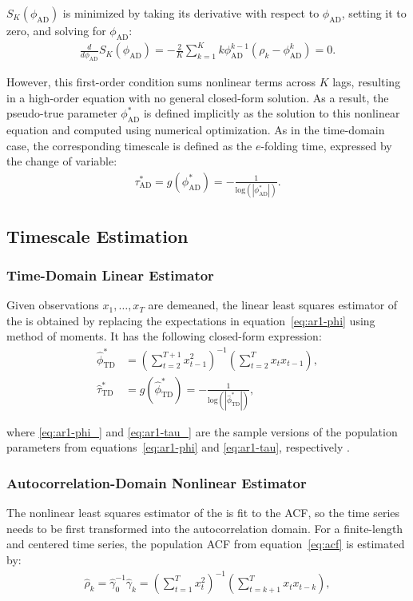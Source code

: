 \documentclass[9pt]{article}
\newcommand{\hatphitd}{\hat{\phi}^*_{\scriptscriptstyle\text{TD}}}
\newcommand{\hattautd}{\hat{\tau}^*_{\scriptscriptstyle\text{TD}}}
\newcommand{\phiad}{\phi_{\scriptscriptstyle\text{AD}}}
\newcommand{\tauad}{\tau_{\scriptscriptstyle\text{AD}}}
\begin{document}
$S_K(\phiad)$ is minimized by taking its derivative with respect to $\phiad$, setting it to zero, and solving for $\phiad$:
\begin{align}
    \frac{d}{d\phiad} S_K(\phiad) = -\frac{2}{K} \sum_{k=1}^K k\phiad^{k-1}(\rho_k - \phiad^k) = 0.
\end{align}

\noindent However, this first-order condition sums nonlinear terms across $K$ lags, resulting in a high-order equation with no general closed-form solution. As a result, the pseudo-true parameter $\phiad^*$ is defined implicitly as the solution to this nonlinear equation and computed using numerical optimization. As in the time-domain case, the corresponding timescale is defined as the $e$-folding time, expressed by the change of variable:
\begin{align}
    \tauad^* = g(\phiad^*) = -\frac{1}{\text{log}(|\phiad^*|)}. \label{eq:nlm-tau}
\end{align}

\subsection{Timescale Estimation}\label{sec:timescale-estimation}
\subsubsection{Time-Domain Linear Estimator}\label{sec:time-domain-linear-estimator}
Given observations $x_1, \dots, x_T$ are demeaned, the linear least squares estimator of the  is obtained by replacing the expectations in equation~\eqref{eq:ar1-phi} using method of moments. It has the following closed-form expression:
\begin{align}
    \hatphitd &= \left(\sum_{t=2}^{T+1} x_{t-1}^2\right)^{-1} \left(\sum_{t=2}^T x_t x_{t-1}\right),\label{eq:ar1-phi_}\\
    \hattautd &= g(\hatphitd) = -\frac{1}{\text{log}(|\hatphitd|)},\label{eq:ar1-tau_}
\end{align}

\noindent where \eqref{eq:ar1-phi_} and \eqref{eq:ar1-tau_} are the sample versions of the population parameters from equations~\eqref{eq:ar1-phi} and \eqref{eq:ar1-tau}, respectively \citep[Chapter~14.3]{hansen_econometrics_2022}.\\


\subsubsection{Autocorrelation-Domain Nonlinear Estimator}\label{sec:autocorrelation-domain-nonlinear-estimator}
The nonlinear least squares estimator of the  is fit to the ACF, so the time series needs to be first transformed into the autocorrelation domain. For a finite-length and centered time series, the population ACF from equation~\eqref{eq:acf} is estimated by:
\begin{align}\label{eq:acf_}
    \hat\rho_k = \hat\gamma_0^{-1}\hat\gamma_k = \left(\sum_{t=1}^T x_t^2\right)^{-1} \left(\sum_{t=k+1}^{T}x_t x_{t-k}\right),
\end{align}
\end{document}
